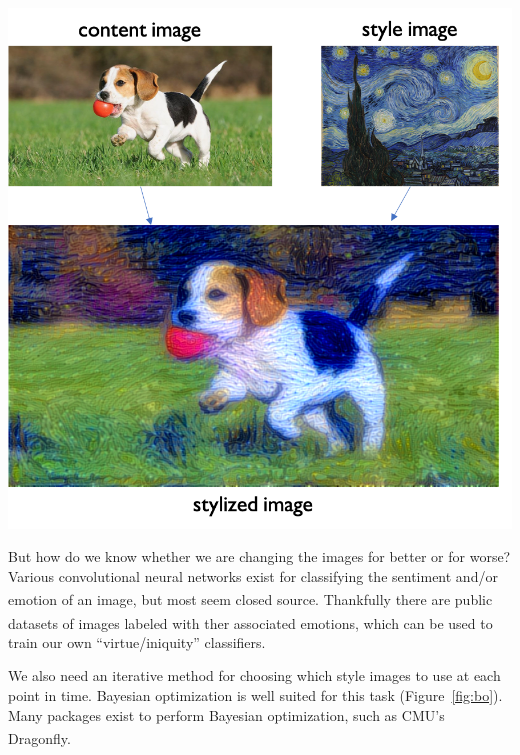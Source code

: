 \documentclass[paperwidth=30in,paperheight=40in,fontscale=0.35]{baposter} %
\begin{document}
\begin{poster}
{    \begin{center}
        \vspace{-5mm}
        \includegraphics[width=\linewidth]{style_transfer}
        \label{fig:style_xfer}
    \end{center}

    But how do we know whether we are changing the images for better or for worse?
    Various convolutional neural networks exist for classifying the sentiment and/or
    emotion of an image,\textsuperscript{\cite{Jou2016, Alvarez-Melis2017}} but most seem
    closed source. Thankfully there are public datasets of images labeled with ther
    associated emotions,\textsuperscript{\cite{Mohammad2018}} which can be used to train
    our own ``virtue/iniquity'' classifiers.

    We also need an iterative method for choosing which style images to use at each point
    in time. Bayesian optimization is well suited for this task (Figure~\ref{fig:bo}).
    Many packages exist to perform Bayesian optimization, such as CMU's
    Dragonfly.\textsuperscript{\cite{Kandasamy2019}}

}
\end{poster}
\end{document}
